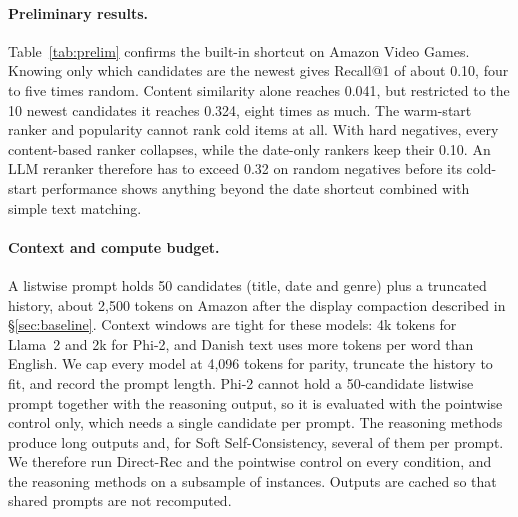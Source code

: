 \documentclass[11pt]{article}
\begin{document}
\paragraph{Preliminary results.} Table~\ref{tab:prelim} confirms the built-in shortcut on Amazon Video Games. Knowing only which candidates are the newest gives Recall@1 of about 0.10, four to five times random. Content similarity alone reaches 0.041, but restricted to the 10 newest candidates it reaches 0.324, eight times as much. The warm-start ranker and popularity cannot rank cold items at all. With hard negatives, every content-based ranker collapses, while the date-only rankers keep their 0.10. An LLM reranker therefore has to exceed 0.32 on random negatives before its cold-start performance shows anything beyond the date shortcut combined with simple text matching.

\paragraph{Context and compute budget.} A listwise prompt holds 50 candidates (title, date and genre) plus a truncated history, about 2{,}500 tokens on Amazon after the display compaction described in \S\ref{sec:baseline}. Context windows are tight for these models: 4k tokens for Llama~2 and 2k for Phi-2, and Danish text uses more tokens per word than English. We cap every model at 4{,}096 tokens for parity, truncate the history to fit, and record the prompt length. Phi-2 cannot hold a 50-candidate listwise prompt together with the reasoning output, so it is evaluated with the pointwise control only, which needs a single candidate per prompt. The reasoning methods produce long outputs and, for Soft Self-Consistency, several of them per prompt. We therefore run Direct-Rec and the pointwise control on every condition, and the reasoning methods on a subsample of instances. Outputs are cached so that shared prompts are not recomputed.

\end{document}
